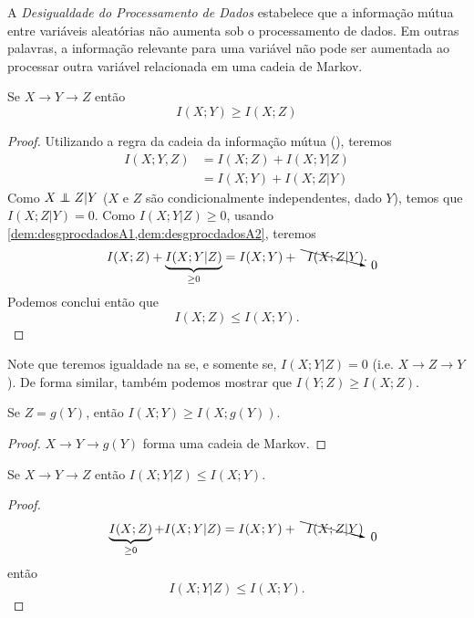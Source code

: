 A \emph{Desigualdade do Processamento de Dados} estabelece que a informação mútua
entre variáveis aleatórias não aumenta sob o processamento de dados. Em outras
palavras, a informação relevante para uma variável não pode ser aumentada ao
processar outra variável relacionada em uma cadeia de Markov.
\begin{theorem}\label{thm:desgprocdados}
Se $X \rightarrow Y \rightarrow Z$ então
\begin{equation}\label{eq:desgprocdados}
I(X;Y) \geq I(X;Z)
\end{equation}
\end{theorem}
\begin{proof}
Utilizando a regra da cadeia da informação mútua (), teremos
\begin{subequations}\label{dem:desgprocdadosA}
  \begin{align}
    I(X;Y,Z) &= I(X;Z) + I(X;Y|Z) \label{dem:desgprocdadosA1}\\
             &= I(X;Y) + I(X;Z|Y) \label{dem:desgprocdadosA2}
  \end{align}
\end{subequations}
Como $X \independent Z |Y$ ($X$ e $Z$ são condicionalmente independentes, dado $Y$), temos
que $I(X;Z|Y)=0$. Como $I(X;Y|Z) \geq 0$, usando \cref{dem:desgprocdadosA1,dem:desgprocdadosA2}, teremos
\begin{equation}
I(X;Z) + \underbrace{I(X; Y|Z)}_{\geq 0} = I(X;Y) + \bcancelto{0}{I(X;Z|Y)} .
\end{equation}
Podemos conclui então que
\begin{equation}
I(X;Z) \leq I(X;Y) .
\end{equation}
\end{proof}
Note que teremos igualdade na  se, e somente se, $I(X;Y|Z)=0$ (i.e. $X \rightarrow Z \rightarrow Y$).
De forma similar, também podemos mostrar que $I(Y;Z) \geq I(X;Z)$.

\begin{corollary}
Se $Z=g(Y)$, então $I(X;Y) \geq I(X;g(Y))$.
\end{corollary}
\begin{proof}
$X \rightarrow Y \rightarrow g(Y)$ forma uma cadeia de Markov.
\end{proof}

\begin{corollary}\label{col:infmutxyzleq}
Se $X \rightarrow Y \rightarrow Z$ então $I(X;Y|Z) \leq I(X;Y)$.
\end{corollary}
\begin{proof}
\begin{equation}
\underbrace{I(X;Z)}_{\geq 0} + I(X; Y|Z) = I(X;Y) + \bcancelto{0}{I(X;Z|Y)}
\end{equation}
então
\begin{equation}
I(X; Y|Z) \leq I(X;Y).
\end{equation}
\end{proof}

